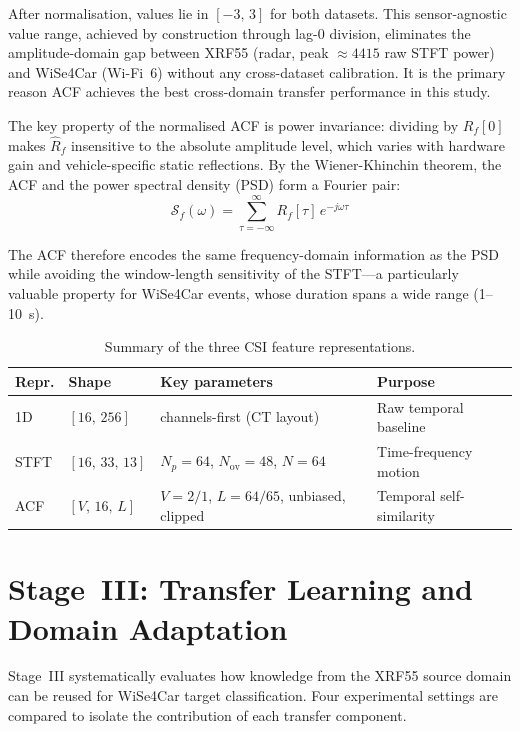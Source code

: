 \documentclass[english,bibtex]{kththesis}
\begin{document}
After normalisation, values lie in $[-3,\,3]$ for both datasets. This sensor-agnostic value range, achieved by construction through lag-0 division, eliminates the amplitude-domain gap between XRF55 (radar, peak ${\approx}4415$ raw STFT power) and WiSe4Car (Wi-Fi~6) without any cross-dataset calibration. It is the primary reason ACF achieves the best cross-domain transfer performance in this study.

The key property of the normalised ACF is power invariance: dividing by $R_f[0]$ makes $\hat{R}_f$ insensitive to the absolute amplitude level, which varies with hardware gain and vehicle-specific static reflections. By the Wiener-Khinchin theorem, the ACF and the power spectral density (PSD) form a Fourier pair:
\begin{equation}
  \mathcal{S}_f(\omega) = \sum_{\tau=-\infty}^{\infty} R_f[\tau]\,e^{-j\omega\tau}
\end{equation}

The ACF therefore encodes the same frequency-domain information as the PSD while avoiding the window-length sensitivity of the STFT---a particularly valuable property for WiSe4Car events, whose duration spans a wide range (1--10~s).

\begin{table}[!ht]
\caption{Summary of the three CSI feature representations.}
\label{tab:representations}
\centering
\small
\begin{tabular}{llll}
\toprule
\textbf{Repr.} & \textbf{Shape} & \textbf{Key parameters} & \textbf{Purpose} \\
\midrule
1D   & $[16,\,256]$       & channels-first (CT layout)                  & Raw temporal baseline \\
STFT & $[16,\,33,\,13]$  & $N_p{=}64$, $N_\text{ov}{=}48$, $N{=}64$ & Time-frequency motion \\
ACF  & $[V,\,16,\,L]$    & $V{=}2/1$, $L{=}64/65$, unbiased, clipped  & Temporal self-similarity \\
\bottomrule
\end{tabular}
\end{table}

\section{Stage~III: Transfer Learning and Domain Adaptation}
\label{sec:transfer}

Stage~III systematically evaluates how knowledge from the XRF55 source domain can be reused for WiSe4Car target classification. Four experimental settings are compared to isolate the contribution of each transfer component.
\end{document}
